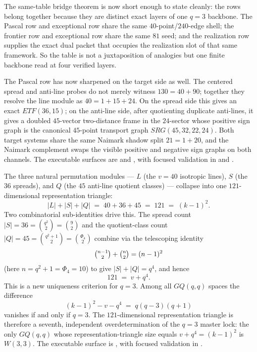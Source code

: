 \documentclass[12pt,a4paper]{article}
\def\mathrm#1{#1}%
\def\textbf#1{#1}%
\def\Phi#1{Phi#1}%
\theoremstyle{definition}
\newcommand{\GQ}{\mathrm{GQ}}
\begin{document}
The same-table bridge theorem is now short enough to state cleanly: the
rows belong together because they are distinct exact layers of one
$q=3$ backbone.  The Pascal row and exceptional row share the same
$40$-point/$240$-edge shell; the frontier row and exceptional row share
the same $81$ seed; and the realization row supplies the exact dual
packet that occupies the realization slot of that same framework.  So
the table is not a juxtaposition of analogies but one finite backbone
read at four verified layers.

The Pascal row has now sharpened on the target side as well.  The
centered spread and anti-line probes do not merely witness
$130=40+90$; together they resolve the line module as $40 = 1 + 15 + 24$.
On the spread side this gives an exact $\mathrm{ETF}(36,15)$; on the
anti-line side, after quotienting duplicate anti-lines, it gives a
doubled $45$-vector two-distance frame in the $24$-sector whose
positive sign graph is the canonical $45$-point transport graph
$\mathrm{SRG}(45,32,22,24)$.  Both target systems share the same
Naimark shadow split $21 = 1 + 20$, and the Naimark complement swaps
the visible positive and negative sign graphs on both channels.  The
executable surfaces are
 and
, with
focused validation in
 and
.

The three natural permutation modules --- $L$ (the $v=40$ isotropic
lines), $S$ (the $36$ spreads), and $Q$ (the $45$ anti-line quotient
classes) --- collapse into one $121$-dimensional representation
triangle:
\begin{equation}
\boxed{|L|+|S|+|Q| \;=\; 40+36+45 \;=\; 121 \;=\; (k-1)^2.}
\label{eq:rep-triangle-121}
\end{equation}
Two combinatorial sub-identities drive this.  The spread count
$|S|=36=\binom{q^2}{2}=\binom{9}{2}$ and the quotient-class count
$|Q|=45=\binom{q^2+1}{2}=\binom{\Phi_4}{2}$ combine via the telescoping
identity
\begin{equation}
\tbinom{n-1}{2}+\tbinom{n}{2}=(n-1)^2
\label{eq:binom-telescope}
\end{equation}
(here $n=q^2+1=\Phi_4=10$) to give $|S|+|Q|=q^4$, and hence
\begin{equation}
\boxed{121 \;=\; v + q^4.}
\label{eq:121-v-q4}
\end{equation}
This is a new uniqueness criterion for $q=3$.  Among all $\GQ(q,q)$
spaces the difference
\begin{equation}
(k-1)^2 - v - q^4 \;=\; q(q-3)(q+1)
\label{eq:rep-triangle-gap}
\end{equation}
vanishes \textbf{if and only if} $q=3$.  The $121$-dimensional
representation triangle is therefore a seventh, independent
overdetermination of the $q=3$ master lock: the only $\GQ(q,q)$ whose
representation-triangle size equals $v+q^4=(k-1)^2$ is $W(3,3)$.
The executable surface is
, with
focused validation in
.
\end{document}
